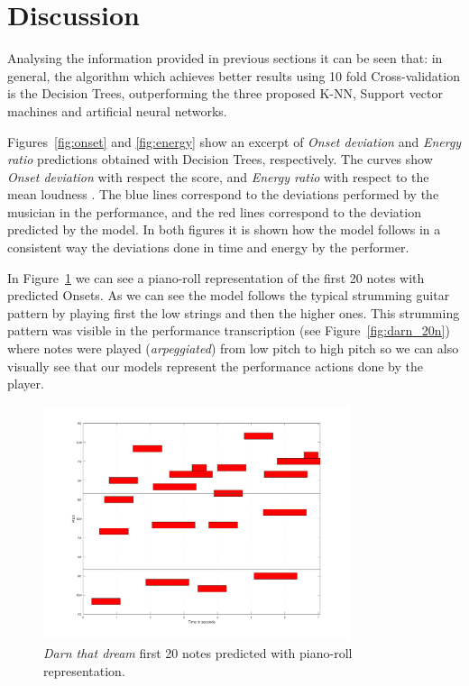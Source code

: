 \section{Discussion}
\label{sec:discussion}
Analysing the information provided in previous sections it can be seen that: in general, the algorithm which achieves better results using 10 fold Cross-validation is the Decision Trees, outperforming the three proposed K-NN, Support vector machines and artificial neural networks.

Figures~\ref{fig:onset} and \ref{fig:energy} show an excerpt of \textit{Onset deviation} and \textit{Energy ratio} predictions obtained with Decision Trees, respectively. The curves show \textit{Onset deviation} with respect the score, and \textit{Energy ratio} with respect to the mean loudness . The blue lines correspond to the deviations performed by the musician in the performance, and the red lines correspond to the deviation predicted by the model. In both figures it is shown how the model follows in a consistent way the deviations done in time and energy by the performer.




In Figure~\ref{fig:predicted_darn} we can see a piano-roll representation of the first 20 notes with predicted Onsets. As we can see the model follows the typical strumming guitar pattern by playing first the low strings and then the higher ones. This strumming pattern was visible in the performance transcription (see Figure~\ref{fig:darn_20n}) where notes were played (\textit{arpeggiated}) from low pitch to high pitch so we can also visually see that our models represent the performance actions done by the player.

\begin{figure}[!ht]
\centering
\includegraphics[width=0.8\textwidth]{Figures/Darn_all_predicted.pdf}
\caption{\textit{Darn that dream} first 20 notes predicted with piano-roll representation.}
\label{fig:predicted_darn}
\end{figure}



